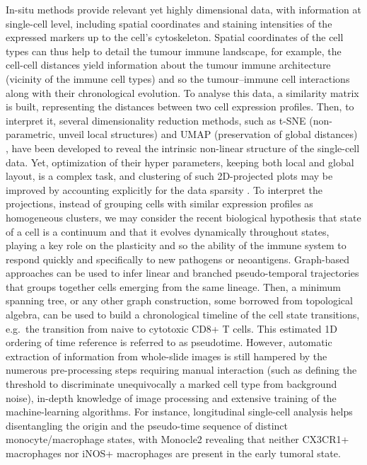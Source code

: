 In-situ methods provide relevant yet highly dimensional data, with
information at single-cell level, including spatial coordinates and
staining intensities of the expressed markers up to the cell's
cytoskeleton. Spatial coordinates of the cell types can thus help to
detail the tumour immune landscape, for example, the cell-cell distances
yield information about the tumour immune architecture (vicinity of the
immune cell types) and so the tumour--immune cell interactions along
with their chronological evolution. To analyse this data, a similarity
matrix is built, representing the distances between two cell expression
profiles. Then, to interpret it, several dimensionality reduction
methods, such as t-SNE \autocite{maaten_hinton08} (non-parametric, unveil local structures) and UMAP (preservation of global distances)
\autocite{becht_etal19}, have been developed to reveal the
intrinsic non-linear structure of the single-cell data. Yet,
optimization of their hyper parameters, keeping both local and global
layout, is a complex task, and clustering of such 2D-projected plots may
be improved by accounting explicitly for the data sparsity
\autocite{pierson_yau15}. To
interpret the projections, instead of grouping cells with similar
expression profiles as homogeneous clusters, we may consider the recent
biological hypothesis that state of a cell is a continuum and that it
evolves dynamically throughout states, playing a key role on the
plasticity and so the ability of the immune system to respond quickly
and specifically to new pathogens or neoantigens. Graph-based approaches
can be used to infer linear and branched pseudo-temporal trajectories
that groups together cells emerging from the same lineage. Then, a
minimum spanning tree, or any other graph construction, some borrowed
from topological algebra, can be used to build a chronological timeline
of the cell state transitions, e.g.~the transition from naive to
cytotoxic CD8+ T cells. This estimated 1D ordering of time reference is
referred to as pseudotime. However, automatic extraction of information
from whole-slide images is still hampered by the numerous pre-processing
steps requiring manual interaction (such as defining the threshold to
discriminate unequivocally a marked cell type from background noise),
in-depth knowledge of image processing and extensive training of the
machine-learning algorithms. For instance, longitudinal single-cell
analysis helps disentangling the origin and the pseudo-time sequence of
distinct monocyte/macrophage states, with Monocle2
\autocite{qiu_etal17} revealing that
neither CX3CR1+ macrophages nor iNOS+ macrophages are present in the
early tumoral state.

